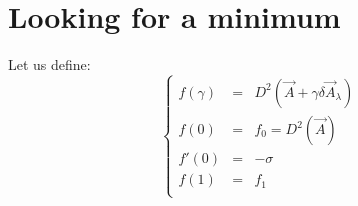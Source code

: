 \documentclass[aps,12pt]{revtex4}
\begin{document}
\section{Looking for a minimum}

Let us define:
\begin{equation}
\left\lbrace
\begin{array}{rcl}
	f(\gamma) & = & D^2(\vec{A}+\gamma \delta\vec{A}_\lambda)\\
	f(0)      & = & f_0 = D^2(\vec{A})\\
	f'(0)     & = & -\sigma\\
	f(1)      & = & f_1\\
\end{array}\right.
\end{equation} 


 
\end{document}
